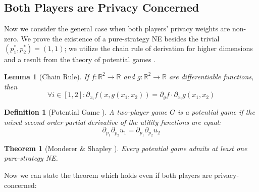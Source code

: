\documentclass[USenglish,oneside,twocolumn]{article}
\theoremstyle{plain}
\newtheorem*{theorem*}{Theorem}
\newtheorem*{lemma*}{Lemma}
\newtheorem*{definition*}{Definition}
\begin{document}
    \vspace{-0.5cm}
    \subsection{Both Players are Privacy Concerned}
    \label{sec:con_vc_con}
    \vspace{-0.25cm}
    
    Now we consider the general case when both players' privacy weights are non-zero. We prove the existence of a pure-strategy NE besides the trivial $(p_1^*,p_2^*)=(1,1)$; we utilize the chain rule of derivation for higher dimensions and a result from the theory of potential games \cite{monderer1996potential}.
    
    \vspace{-0.25cm}
    \begin{lemma*}[Chain Rule]
        If $f:\mathbb{R}^2\rightarrow\mathbb{R}$ and $g:\mathbb{R}^2\rightarrow\mathbb{R}$ are differentiable functions, then
        \vspace{-0.1cm}
        \begin{equation*}
        \forall i\in[1,2]:\partial_{x_i} f(x,g(x_1,x_2))=\partial_g f\cdot\partial_{x_i}g(x_1,x_2)
        \end{equation*}
    \end{lemma*}
    \vspace{-0.5cm}
    \begin{definition*}[Potential Game \cite{monderer1996potential}]
        A two-player game $G$ is a potential game if the mixed second order partial derivative of the utility functions are equal:
        \vspace{-0.1cm}
        \begin{equation}
        \label{def:pot}
        \partial_{p_1}\partial_{p_2}u_1=\partial_{p_1}\partial_{p_2}u_2
        \end{equation}
    \end{definition*}
    \vspace{-0.5cm}
    \begin{theorem*}[Monderer \& Shapley \cite{monderer1996potential}]
        Every potential game admits at least one pure-strategy NE.
    \end{theorem*}
    \vspace{-0.25cm}
    
    Now we can state the theorem which holds even if both players are privacy-concerned:
    
\end{document}

